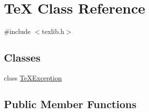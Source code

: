 \hypertarget{class_te_x}{}\section{TeX Class Reference}
\label{class_te_x}


{\ttfamily \#include $<$texlib.\+h$>$}

\subsection*{Classes}
\begin{DoxyCompactItemize}
\item 
class \hyperlink{class_te_x_1_1_te_x_exception}{Te\+X\+Exception}
\end{DoxyCompactItemize}
\subsection*{Public Member Functions}
